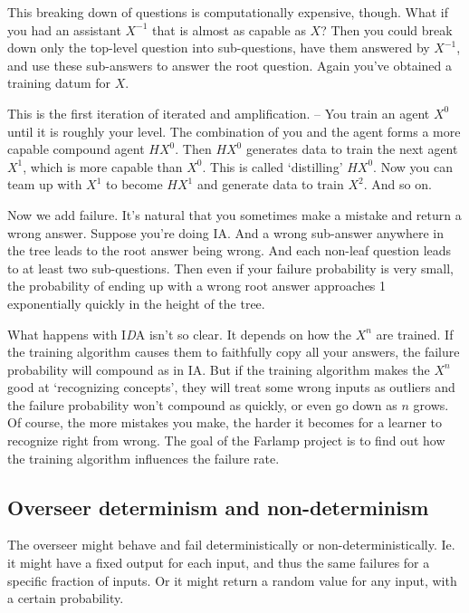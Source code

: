 \documentclass{farlamp}
\begin{document}
This breaking down of questions is computationally expensive, though. What if
you had an assistant $X^{-1}$ that is almost as capable as $X$? Then you could
break down only the top-level question into sub-questions, have them answered by
$X^{-1}$, and use these sub-answers to answer the root question. Again you've
obtained a training datum for $X$.

This is the first iteration of iterated  and amplification.
-- You train an agent $X^0$ until it is roughly your level. The combination of
you and the agent forms a more capable compound agent $HX^0$. Then $HX^0$
generates data to train the next agent $X^1$, which is more capable than $X^0$.
This is called ‘distilling’ $HX^0$. Now you can team up with $X^1$ to become
$HX^1$ and generate data to train $X^2$. And so on.

Now we add failure. It's natural that you sometimes make a mistake and return a
wrong answer. Suppose you're doing IA. And a wrong sub-answer anywhere in the
tree leads to the root answer being wrong. And each non-leaf question leads to
at least two sub-questions. Then even if your failure probability is very small,
the probability of ending up with a wrong root answer approaches 1 exponentially
quickly in the height of the tree.\parencite{ChriRelAmp}

What happens with I\emph{D}A isn't so clear. It depends on how the $X^n$ are
trained. If the training algorithm causes them to faithfully copy all your
answers, the failure probability will compound as in IA. But if the training
algorithm makes the $X^n$ good at ‘recognizing concepts’, they will treat some
wrong inputs as outliers and the failure probability won't compound as quickly,
or even go down as $n$ grows. Of course, the more mistakes you make, the harder
it becomes for a learner to recognize right from wrong. The goal of the Farlamp
project is to find out how the training algorithm influences the failure rate.


\subsection{Overseer determinism and non-determinism}

The overseer might behave and fail deterministically or non-deterministically.
Ie. it might have a fixed output for each input, and thus the same failures for
a specific fraction of inputs. Or it might return a random value for any input,
with a certain probability.
\end{document}
